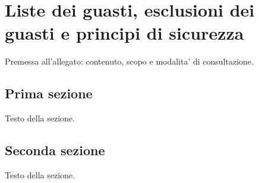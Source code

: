 \chapter{Liste dei guasti, esclusioni dei guasti e principi di sicurezza}
\label{app:C}

Premessa all'allegato: contenuto, scopo e modalita' di consultazione.

\section{Prima sezione}
\label{sec:appC-1}

Testo della sezione.

\section{Seconda sezione}
\label{sec:appC-2}

Testo della sezione.
